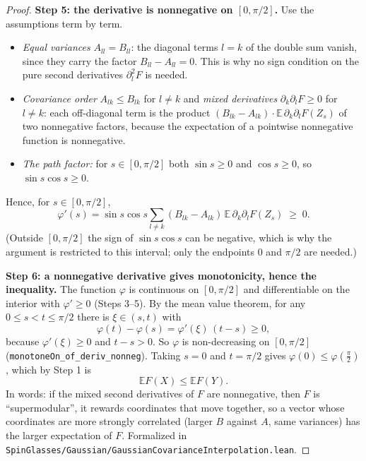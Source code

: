 \begin{proof}
\textbf{Step 5: the derivative is nonnegative on $[0,\pi/2]$.} Use the assumptions term by term.
\begin{itemize}
\item \emph{Equal variances} $A_{ll}=B_{ll}$: the diagonal terms $l=k$ of the double sum vanish, since they carry the factor $B_{ll}-A_{ll}=0$. This is why no sign condition on the pure second derivatives $\partial_l^2F$ is needed.
\item \emph{Covariance order} $A_{lk}\le B_{lk}$ for $l\ne k$ and \emph{mixed derivatives} $\partial_k\partial_lF\ge0$ for $l\ne k$: each off-diagonal term is the product $(B_{lk}-A_{lk})\cdot\mathbb{E}\,\partial_k\partial_lF(Z_s)$ of two nonnegative factors, because the expectation of a pointwise nonnegative function is nonnegative.
\item \emph{The path factor:} for $s\in[0,\pi/2]$ both $\sin s\ge0$ and $\cos s\ge0$, so $\sin s\cos s\ge0$.
\end{itemize}
Hence, for $s\in[0,\pi/2]$,
\[
\varphi'(s)=\sin s\cos s\sum_{l\ne k}(B_{lk}-A_{lk})\,\mathbb{E}\,\partial_k\partial_lF(Z_s)\;\ge\;0.
\]
(Outside $[0,\pi/2]$ the sign of $\sin s\cos s$ can be negative, which is why the argument is restricted to this interval; only the endpoints $0$ and $\pi/2$ are needed.)

\textbf{Step 6: a nonnegative derivative gives monotonicity, hence the inequality.}
The function $\varphi$ is continuous on $[0,\pi/2]$ and differentiable on the interior with $\varphi'\ge0$ (Steps 3--5). By the mean value theorem, for any $0\le s<t\le\pi/2$ there is $\xi\in(s,t)$ with
\[
\varphi(t)-\varphi(s)=\varphi'(\xi)\,(t-s)\ge0,
\]
because $\varphi'(\xi)\ge0$ and $t-s>0$. So $\varphi$ is non-decreasing on $[0,\pi/2]$ (\texttt{monotoneOn\_of\_deriv\_nonneg}). Taking $s=0$ and $t=\pi/2$ gives $\varphi(0)\le\varphi(\frac\pi2)$, which by Step 1 is
\[
\mathbb{E}F(X)\le\mathbb{E}F(Y).
\]
In words: if the mixed second derivatives of $F$ are nonnegative, then $F$ is ``supermodular'', it rewards coordinates that move together, so a vector whose coordinates are more strongly correlated (larger $B$ against $A$, same variances) has the larger expectation of $F$.
Formalized in \texttt{SpinGlasses/Gaussian/GaussianCovarianceInterpolation.lean}.
\end{proof}

